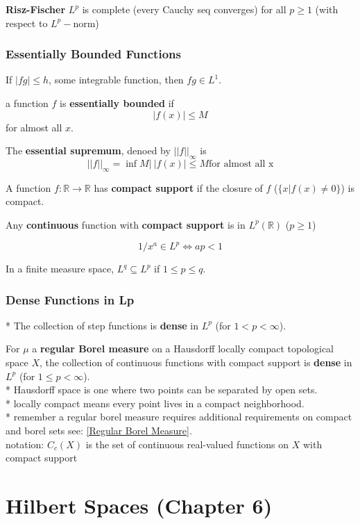 \documentclass[a4paper, 12pt]{article}
\def\R{\ensuremath{\mathbb{R}}} %
\newcommand{\bt}[1]{\textbf{#1}} %
\begin{document}
\begin{multicols}{2}
\bt{Risz-Fischer} $L^p$ is complete (every Cauchy seq converges) for all $p \geq 1$ (with respect to $L^p-$norm)

\subsubsection{Essentially Bounded Functions}

If $|fg| \leq h$, some integrable function, then $fg \in L^1$.

a function $f$ is \bt{essentially bounded} if 
$$| f(x) | \leq M$$ 
for almost all $x$.

The \bt{essential supremum}, denoed by $||f||_\infty$ is 
$$||f||_\infty = \inf{M |\ |f(x)| \leq M \text{for almost all x}}$$

A function $f: \R \rightarrow \R$ has \bt{compact support} if 
the closure of $f$ ($\{x | f(x) \neq 0\}$) is compact.

Any \bt{continuous} function with \bt{compact support} is in $L^p(\R)$ 
($p \geq 1$)

$$1/x^a \in L^p \iff ap < 1$$

In a finite measure space, $L^q \subseteq L^p$ if $1 \leq p \leq q$.

\subsubsection{Dense Functions in Lp}

* The collection of step functions is \bt{dense} in $L^p$ (for $1 < p < \infty$).

For $\mu$ a \bt{regular Borel measure} on a Hausdorff locally compact topological space $X$, 
the collection of continuous functions with compact support is \bt{dense} in $L^p$ 
(for $1 \leq p < \infty$).\\

* Hausdorff space is one where two points can be separated by open sets. \\
* locally compact means every point lives in a compact neighborhood.\\
* remember a regular borel measure requires additional requirements on compact and borel sets 
see: \ref{Regular Borel Measure}. \\

notation: $C_c(X)$ is the set of continuous real-valued functions on $X$ with 
compact support



\section{Hilbert Spaces (Chapter 6)}


\end{multicols}
\end{document}
